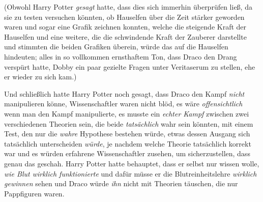 (Obwohl Harry Potter \emph{gesagt} hatte, dass dies sich immerhin überprüfen ließ, da sie zu testen versuchen könnten, ob Hauselfen über die Zeit stärker geworden waren und sogar eine Grafik zeichnen konnten, welche die steigende Kraft der Hauselfen und eine weitere, die die schwindende Kraft der Zauberer darstellte und stimmten die beiden Grafiken überein, würde das auf die Hauselfen hindeuten; alles in so vollkommen ernsthaftem Ton, dass Draco den Drang verspürt hatte, Dobby ein paar gezielte Fragen unter Veritaserum zu stellen, ehe er wieder zu sich kam.)

Und schließlich hatte Harry Potter noch gesagt, dass Draco den Kampf \emph{nicht} manipulieren könne, Wissenschaftler waren nicht blöd, es wäre \emph{offensichtlich} wenn man den Kampf manipulierte, es musste ein \emph{echter Kampf} zwischen zwei verschiedenen Theorien sein, die beide \emph{tatsächlich} wahr sein könnten, mit einem Test, den nur die \emph{wahre} Hypothese bestehen würde, etwas dessen Ausgang sich tatsächlich unterscheiden \emph{würde}, je nachdem welche Theorie tatsächlich korrekt war und es würden erfahrene Wissenschaftler zusehen, um sicherzustellen, dass genau das geschah. Harry Potter hatte behauptet, dass er selbst nur wissen wolle, \emph{wie Blut wirklich funktionierte} und dafür müsse er die Blutreinheitslehre \emph{wirklich} \emph{gewinnen} sehen und Draco würde \emph{ihn} nicht mit Theorien täuschen, die nur Pappfiguren waren.

